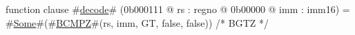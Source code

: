function clause #\hyperref[zdecode]{decode}# (0b000111 @ rs : regno @ 0b00000 @ imm : imm16) =
  #\hyperref[zSome]{Some}#(#\hyperref[zBCMPZ]{BCMPZ}#(rs, imm, GT, false, false)) /* BGTZ */
